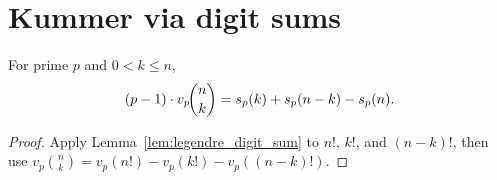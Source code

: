 \section{Kummer via digit sums}

\begin{theorem}
  \label{thm:kummer_digit_sum}
  \rocqok
  For prime $p$ and $0 < k \leq n$,
  \[
    (p-1) \cdot v_p\!\binom{n}{k}
    = s_p(k) + s_p(n-k) - s_p(n).
  \]
  \begin{proof}
    \rocqok
    Apply Lemma~\ref{lem:legendre_digit_sum} to $n!$, $k!$, and $(n-k)!$,
    then use $v_p\binom{n}{k} = v_p(n!) - v_p(k!) - v_p((n-k)!)$.
  \end{proof}
\end{theorem}
